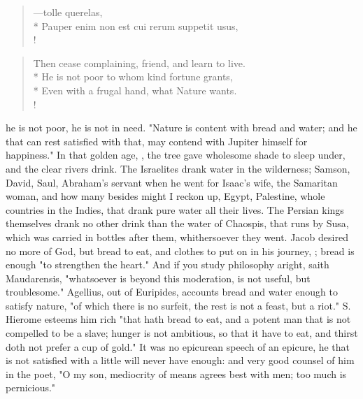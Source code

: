 {\begin{latin}
\begin{verse}%
---tolle querelas,\\*
Pauper enim non est cui rerum suppetit usus,\\!
\end{verse}%
\end{latin}
\translationrule%
\begin{verse}%
Then cease complaining, friend, and learn to live.\\*
He is not poor to whom kind fortune grants,\\*
Even with a frugal hand, what Nature wants.\\!
\end{verse}%
%

he is not poor, he is not in need. "Nature is content with bread and water; and he that can rest satisfied with that, may contend with Jupiter himself for happiness." In that golden age, , the tree gave wholesome shade to sleep under, and the clear rivers drink. The Israelites drank water in the wilderness; Samson, David, Saul, Abraham's servant when he went for Isaac's wife, the Samaritan woman, and how many besides might I reckon up, Egypt, Palestine, whole countries in the Indies, that drank pure water all their lives. The Persian kings themselves drank no other drink than the water of Chaospis, that runs by Susa, which was carried in bottles after them, whithersoever they went. Jacob desired no more of God, but bread to eat, and clothes to put on in his journey,  ; bread is enough "to strengthen the heart." And if you study philosophy aright, saith Maudarensis, "whatsoever is beyond this moderation, is not useful, but troublesome." Agellius, out of Euripides, accounts bread and water enough to satisfy nature, "of which there is no surfeit, the rest is not a feast, but a riot." S. Hierome esteems him rich "that hath bread to eat, and a potent man that is not compelled to be a slave; hunger is not ambitious, so that it have to eat, and thirst doth not prefer a cup of gold." It was no epicurean speech of an epicure, he that is not satisfied with a little will never have enough: and very good counsel of him in the poet, "O my son, mediocrity of means agrees best with men; too much is pernicious."

}
